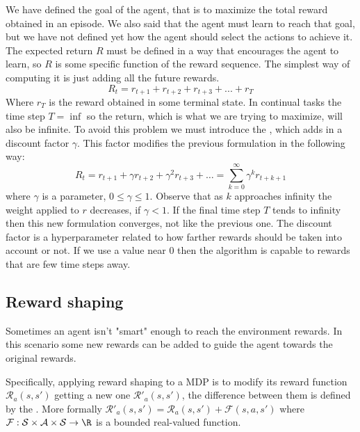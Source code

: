We have defined the goal of the agent, that is to maximize the total reward obtained in an episode. We also said that the agent must learn to reach that goal, but we have not defined yet how the agent should select the actions to achieve it. The expected return $R$ must be defined in a way that encourages the agent to learn, so $R$ is some specific function of the reward sequence. The simplest way of computing it is just adding all the future rewards.
\begin{equation}
    R_t=r_{t+1}+r_{t+2}+r_{t+3}+...+r_T
\end{equation}
Where $r_T$ is the reward obtained in some terminal state. In continual tasks the
time step $T = \inf$ so the return, which is what we are trying to maximize, will also be infinite. To avoid this problem we must introduce
the , which adds in a discount factor $\gamma$. This factor modifies the previous formulation in the following way:
\begin{equation}
    R_t = r_{t+1} + \gamma r_{t+2} + \gamma^2 r_{t+3} + \dots = \sum_{k=0}^\infty\gamma^k r_{t+k+1}
\end{equation}
where $\gamma$ is a parameter, $0 \leq \gamma \leq 1$. Observe that as $k$ approaches infinity
the weight applied to $r$ decreases, if $\gamma < 1$. If the final time step $T$ tends to infinity
then this new formulation converges, not like the previous one. The discount factor is a hyperparameter
related to how farther rewards should be taken into account or not. If we use a value near 0 then the algorithm
is capable to rewards that are few time steps away.

\subsection{Reward shaping}

Sometimes an agent isn’t "smart" enough to reach the environment rewards. In this scenario some new rewards can be added to guide the agent towards the original rewards.

Specifically, applying reward shaping to a \ac{MDP} is to modify its reward function $\mathcal{R}_a(s,s')$ getting a new one $\mathcal{R'}_a(s,s')$, the difference between them is defined by the
. More formally
$\mathcal{R'}_a(s,s') = \mathcal{R}_a(s,s') + \mathcal{F}(s,a,s')$ where
$\mathcal{F} : \mathcal{S} \times \mathcal{A} \times \mathcal{S} \rightarrow \R$ is a bounded real-valued function.

